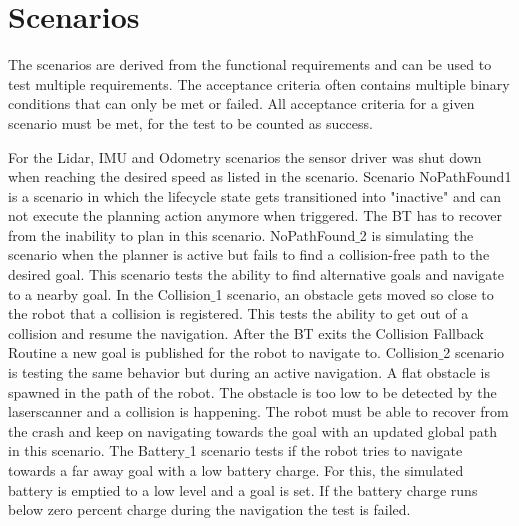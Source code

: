 \section{Scenarios}

The scenarios are derived from the functional requirements and can be used to test multiple requirements.
The acceptance criteria often contains multiple binary conditions that can only be met or failed. All acceptance criteria for a given scenario must be met, for the test to be counted as success.  

For the Lidar, IMU and Odometry scenarios the sensor driver was shut down when reaching the desired speed as listed in the scenario. 
Scenario NoPathFound1 is a scenario in which the lifecycle state gets transitioned into "inactive" and can not execute the planning action anymore when triggered. The BT has to recover from the inability to plan in this scenario.
NoPathFound$\_$2 is simulating the scenario when the planner is active but fails to find a collision-free path to the desired goal. This scenario tests the ability to find alternative goals and navigate to a nearby goal. 
In the Collision$\_$1 scenario, an obstacle gets moved so close to the robot that a collision is registered. This tests the ability to get out of a collision and resume the navigation. After the BT exits the Collision Fallback Routine a new goal is published for the robot to navigate to.
Collision$\_$2 scenario is testing the same behavior but during an active navigation. A flat obstacle is spawned in the path of the robot. The obstacle is too low to be detected by the laserscanner and a collision is happening. The robot must be able to recover from the crash and keep on navigating towards the goal with an updated global path in this scenario. 
The Battery$\_$1 scenario tests if the robot tries to navigate towards a far away goal with a low battery charge. For this, the simulated battery is emptied to a low level and a goal is set. If the battery charge runs below zero percent charge during the navigation the test is failed. 



